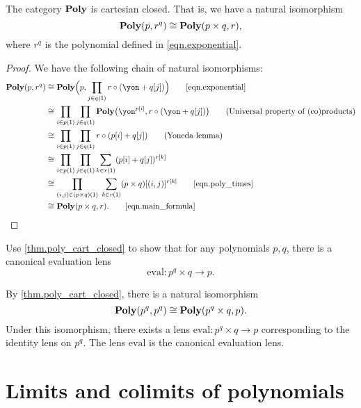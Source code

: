 \documentclass[Book-Poly]{subfiles}
\begin{document}
\begin{theorem}\label{thm.poly_cart_closed}
The category $\mathbf{Poly}$ is cartesian closed. That is, we have a natural isomorphism
\[
    \mathbf{Poly}(p,r^q) \cong \mathbf{Poly}(p\times q,r),
\]
where $r^q$ is the polynomial defined in \eqref{eqn.exponential}.
\end{theorem}
\begin{proof}
We have the following chain of natural isomorphisms:
\begin{align*}
	\poly(p, r^q) &\iso
	\poly\Big(p, \prod_{j \in q(\1)} r \circ (\yon+q[j])\Big)
	\tag*{\eqref{eqn.exponential}} \\
	&\iso
	\prod_{i\in p(\1)}\prod_{j\in q(\1)}\poly\big(\yon^{p[i]},r\circ(\yon+q[j])\big)
	\tag{Universal property of (co)products} \\
	&\iso
	\prod_{i\in p(\1)}\prod_{j\in q(\1)}r\circ(p[i]+q[j])
	\tag{Yoneda lemma} \\
	&\iso
	\prod_{i\in p(\1)}\prod_{j\in q(\1)}\sum_{k\in r(\1)}(p[i]+q[j])^{r[k]}
	\\
	&\iso
	\prod_{(i,j) \in (p \times q)(\1)} \; \sum_{k\in r(\1)}(p \times q)[(i, j)]^{r[k]}
	\tag*{\eqref{eqn.poly_times}} \\
	&\iso
	\poly(p \times q,r).
	\tag*{\eqref{eqn.main_formula}}
\end{align*}
\end{proof}

\begin{exercise}
Use \cref{thm.poly_cart_closed} to show that for any polynomials $p,q$, there is a canonical evaluation lens
\begin{equation*}%
	\text{eval}\colon p^q \times q \to p.
\end{equation*}
\begin{solution}
By \cref{thm.poly_cart_closed}, there is a natural isomorphism
\[
    \mathbf{Poly}(p^q, p^q) \cong \mathbf{Poly}(p^q \times q, p).
\]
Under this isomorphism, there exists a lens $\text{eval} \colon p^q \times q \to p$ corresponding to the identity lens on $p^q$.
The lens $\text{eval}$ is the canonical evaluation lens.
\end{solution}
\end{exercise}


\section{Limits and colimits of polynomials}
\end{document}
